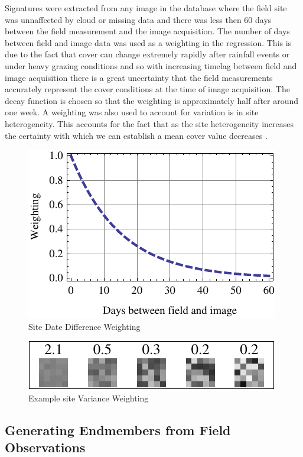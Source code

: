 \documentclass[remotesensing,article,accept,moreauthors,pdftex,12pt,a4paper]{mdpi}
\begin{document}
Signatures were extracted from any image in the database where the field site was unnaffected by cloud or missing data and there was less then 60 days between the field measurement and the image acquisition. The number of days between field and image data was used as a weighting in the regression. This is due to the fact that cover can change extremely rapidly after rainfall events or under heavy grazing conditions and so with increasing timelag between field and image acquisition there is a great uncertainty that the field measurements accurately represent the cover conditions at the time of image acquisition. The decay function is chosen so that the weighting is approximately half after around one week. A weighting was also used to account for variation is in site heterogeneity. This accounts for the fact that as the site heterogeneity increases the certainty with which we can establish a mean cover value decreases \citep{Korb2003}.
%
%

\begin{figure}
\includegraphics{dateWeightPlot.pdf}
\caption{\label{fig:dateWeighting}Site Date Difference Weighting}
\end{figure} 

\begin{figure}
\includegraphics{homoWeightPlot.pdf}
\caption{\label{fig:varWeighting}Example site Variance Weighting} 
\end{figure} 

 \subsection{Generating Endmembers from Field Observations}
\end{document}
